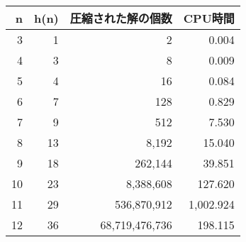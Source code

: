 \begin{table}[t]\scriptsize
\begin{tabular}{r|r|r|r}
 \hline
 n& h(n)& 圧縮された解の個数& CPU時間 \\
 \hline
 3&	1&	2&	0.004 \\
 4&	3&	8&	0.009 \\
 5&	4&	16&	0.084 \\
 6&	7&	128&	0.829 \\
 7&	9&	512&	7.530 \\
 8&	13&	8,192&	15.040 \\
 9&	18&	262,144&	39.851 \\
 10&	23&	8,388,608&	127.620 \\
 11&	29&	536,870,912&	1,002.924 \\
 12&	36&	68,719,476,736&	198.115 \\
\end{tabular}
\end{table}
